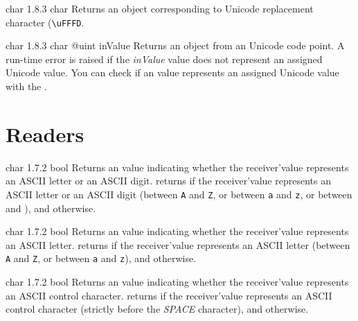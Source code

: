 {char}
{1.8.3}
{char}
{Returns an  object corresponding to Unicode replacement character (\texttt{\textquotesingle\textbackslash uFFFD}.}
{}







{char}
{1.8.3}
{char}
{@uint inValue}
{Returns an  object from an Unicode code point.}
{A run-time error is raised if the \emph{inValue} value does not represent an assigned Unicode value. You can check if an  value represents an assigned Unicode value with the .}


\section{Readers}


{char}
{1.7.2}
{bool}
{Returns an  value indicating whether the receiver'value represents an ASCII letter or an ASCII digit.}
{returns  if the receiver'value represents an ASCII letter or an ASCII digit (between \texttt{\textquotesingle A\textquotesingle} and \texttt{\textquotesingle Z\textquotesingle}, or between \texttt{\textquotesingle a\textquotesingle} and \texttt{\textquotesingle z\textquotesingle}, or between \texttt{\textquotesingle} and \texttt{\textquotesingle}), and  otherwise.}




{char}
{1.7.2}
{bool}
{Returns an  value indicating whether the receiver'value represents an ASCII letter.}
{returns  if the receiver'value represents an ASCII letter (between \texttt{\textquotesingle A\textquotesingle} and \texttt{\textquotesingle Z\textquotesingle}, or between \texttt{\textquotesingle a\textquotesingle} and \texttt{\textquotesingle z\textquotesingle}), and  otherwise.}




{char}
{1.7.2}
{bool}
{Returns an  value indicating whether the receiver'value represents an ASCII control character.}
{returns  if the receiver'value represents an ASCII control character (strictly before the \emph{SPACE} character), and  otherwise.}





